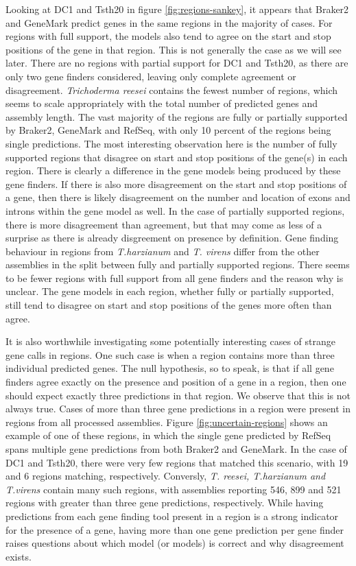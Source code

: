 Looking at DC1 and Tsth20 in figure \ref{fig:regions-sankey}, it
appears that Braker2 and GeneMark predict genes in the same regions in
the majority of cases. For regions with full support, the models also
tend to agree on the start and stop positions of the gene in that
region. This is not generally the case as we will see later. There are
no regions with partial support for DC1 and Tsth20, as there are only
two gene finders considered, leaving only complete agreement or
disagreement. \textit{Trichoderma reesei} contains the fewest number
of regions, which seems to scale appropriately with the total number
of predicted genes and assembly length. The vast majority of the
regions are fully or partially supported by Braker2, GeneMark and
RefSeq, with only 10 percent of the regions being single
predictions. The most interesting observation here is the number of
fully supported regions that disagree on start and stop positions of
the gene(s) in each region. There is clearly a difference in the gene
models being produced by these gene finders. If there is also more
disagreement on the start and stop positions of a gene, then there is
likely disagreement on the number and location of exons and introns
within the gene model as well. In the case of partially supported
regions, there is more disagreement than agreement, but that may come
as less of a surprise as there is already disgreement on presence by
definition. Gene finding behaviour in regions from
\textit{T.harzianum} and \textit{T. virens} differ from the other
assemblies in the split between fully and partially supported
regions. There seems to be fewer regions with full support from all
gene finders and the reason why is unclear. The gene models in each
region, whether fully or partially supported, still tend to disagree
on start and stop positions of the genes more often than agree.

It is also worthwhile investigating some potentially interesting cases
of strange gene calls in regions. One such case is when a region
contains more than three individual predicted genes. The null
hypothesis, so to speak, is that if all gene finders agree exactly on
the presence and position of a gene in a region, then one should
expect exactly three predictions in that region. We observe that this
is not always true. Cases of more than three gene predictions in a
region were present in regions from all processed assemblies. Figure
\ref{fig:uncertain-regions} shows an example of one of these regions,
in which the single gene predicted by RefSeq spans multiple gene
predictions from both Braker2 and GeneMark. In the case of DC1 and
Tsth20, there were very few regions that matched this scenario, with
19 and 6 regions matching, respectively. Conversly, \textit{T. reesei,
  T.harzianum and T.virens} contain many such regions, with assemblies
reporting 546, 899 and 521 regions with greater than three gene
predictions, respectively. While having predictions from each gene
finding tool present in a region is a strong indicator for the
presence of a gene, having more than one gene prediction per gene
finder raises questions about which model (or models) is correct and
why disagreement exists.

